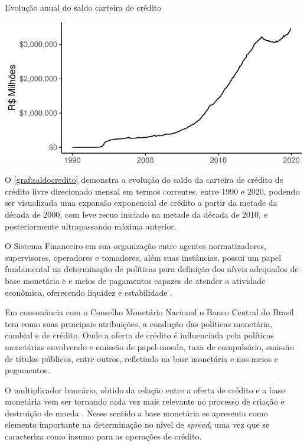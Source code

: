\documentclass[
  12pt,
  12pt,
  openright,
  oneside,
  a4paper,
  chapter=TITLE,
  section=TITLE,
  subsection=TITLE,
  subsubsection=TITLE,
  english,
  portugues,
  sumario=tradicional]{abntex2}
\begin{document}
\begin{grafico}[!ht]
\vspace{20pt}
\caption{Evolução anual do saldo carteira de crédito}
\vspace{-4mm}

\begin{center}\includegraphics{12-exportedfigures/balance.credit-1} \end{center}
\vspace{-3mm}
\label{graf:saldocredito}
\vspace{-2mm}
\end{grafico}

O \autoref{graf:saldocredito} demonstra a evolução do saldo da carteira de crédito de crédito livre direcionado mensal em termos correntes, entre 1990 e 2020, podendo ser visualizada uma expansão exponencial de crédito a partir da metade da década de 2000, com leve recuo iniciado na metade da década de 2010, e posteriormente ultrapassando máxima anterior.

O Sistema Financeiro em sua organização entre agentes normatizadores, supervisores, operadores e tomadores, além suas instâncias, possui um papel fundamental na determinação de políticas para definição dos níveis adequados de base monetária e e meios de pagamentos capazes de atender a atividade econômica, oferecendo liquidez e estabilidade .

Em consonância com o Conselho Monetário Nacional o Banco Central do Brasil tem como suas principais atribuições, a condução das políticas monetária, cambial e de crédito. Onde a oferta de crédito é influenciada pela políticas monetárias envolvendo e emissão de papel-moeda, taxa de compulsório, emissão de títulos públicos, entre outros, refletindo na base monetária e nos meios e pagamentos.

O multiplicador bancário, obtido da relação entre a oferta de crédito e a base monetária vem ser tornando cada vez mais relevante no processo de criação e destruição de moeda \cite{bacen:juros:1999, rey:2017, almonacid:1976}. Nesse sentido a base monetária se apresenta como elemento importante na determinação no nível de \emph{spread}, uma vez que se caracteriza como insumo para as operações de crédito.
\end{document}
